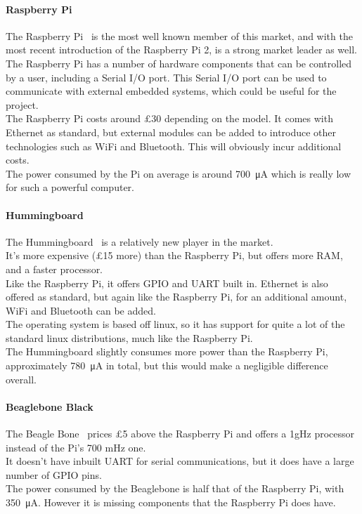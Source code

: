 \documentclass[draft,preprint,12pt,3p]{elsarticle}
\begin{document}
\paragraph{Raspberry Pi}
The Raspberry Pi~\cite{raspberrypi} is the most well known member of this market, and with the most recent introduction of the Raspberry Pi 2, is a strong market leader as well.\\
The Raspberry Pi has a number of hardware components that can be controlled by a user, including a Serial I/O port. This Serial I/O port can be used to communicate with external embedded systems, which could be useful for the project.\\
The Raspberry Pi costs around \pounds30 depending on the model. It comes with Ethernet as standard, but external modules can be added to introduce other technologies such as WiFi and Bluetooth. This will obviously incur additional costs.\\
The power consumed by the Pi on average is around \SI{700}{\micro\ampere} which is really low for such a powerful computer.


\paragraph{Hummingboard}
The Hummingboard~\cite{hummingboard} is a relatively new player in the market.\\
It's more expensive (\pounds15 more) than the Raspberry Pi, but offers more RAM, and a faster processor.\\
Like the Raspberry Pi, it offers GPIO and UART built in. Ethernet is also offered as standard, but again like the Raspberry Pi, for an additional amount, WiFi and Bluetooth can be added.\\
The operating system is based off linux, so it has support for quite a lot of the standard linux distributions, much like the Raspberry Pi.\\
The Hummingboard slightly consumes more power than the Raspberry Pi, approximately \SI{780}{\micro\ampere} in total, but this would make a negligible difference overall.
\paragraph{Beaglebone Black}
The Beagle Bone~\cite{beaglebone} prices \pounds5 above the Raspberry Pi and offers a 1gHz processor instead of the Pi's 700 mHz one.\\
It doesn't have inbuilt UART for serial communications, but it does have a large number of GPIO pins.\\
The power consumed by the Beaglebone is half that of the Raspberry Pi, with \SI{350}{\micro\ampere}. However it is missing components that the Raspberry Pi does have.
\end{document}
